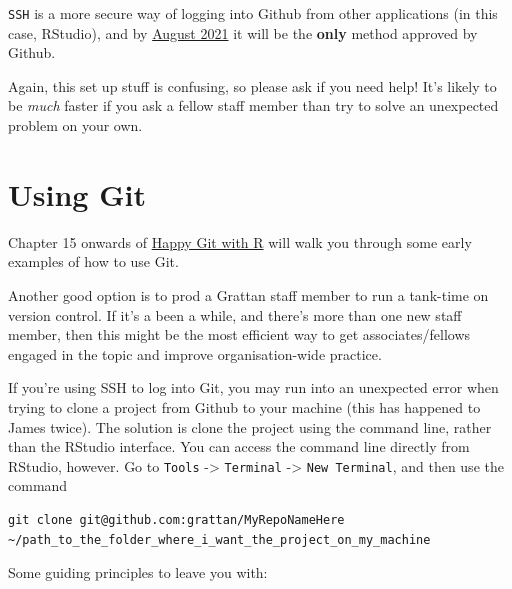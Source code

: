 \documentclass[
]{book}
\begin{document}
\texttt{SSH} is a more secure way of logging into Github from other applications (in this case, RStudio), and by \href{https://github.blog/2020-12-15-token-authentication-requirements-for-git-operations/}{August 2021} it will be the \textbf{only} method approved by Github.

Again, this set up stuff is confusing, so please ask if you need help! It's likely to be \emph{much} faster if you ask a fellow staff member than try to solve an unexpected problem on your own.

\hypertarget{using-git}{%
\section{Using Git}\label{using-git}}

Chapter 15 onwards of \href{https://happygitwithr.com/install-intro.html}{Happy Git with R} will walk you through some early examples of how to use Git.

Another good option is to prod a Grattan staff member to run a tank-time on version control. If it's a been a while, and there's more than one new staff member, then this might be the most efficient way to get associates/fellows engaged in the topic and improve organisation-wide practice.

If you're using SSH to log into Git, you may run into an unexpected error when trying to clone a project from Github to your machine (this has happened to James twice). The solution is clone the project using the command line, rather than the RStudio interface. You can access the command line directly from RStudio, however. Go to \texttt{Tools} -\textgreater{} \texttt{Terminal} -\textgreater{} \texttt{New\ Terminal}, and then use the command

\begin{verbatim}
git clone git@github.com:grattan/MyRepoNameHere ~/path_to_the_folder_where_i_want_the_project_on_my_machine
\end{verbatim}

Some guiding principles to leave you with:
\end{document}
